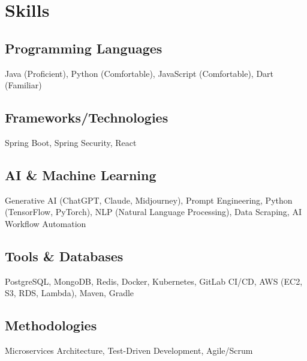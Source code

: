 \documentclass[]{deedy-resume-reversed}
\begin{document}
\begin{minipage}[t]{0.32\textwidth}



\section{Skills}
\subsection{Programming Languages}
Java (Proficient), Python (Comfortable), JavaScript (Comfortable), Dart (Familiar) \smallskip
\sectionsep

\subsection{Frameworks/Technologies}
Spring Boot, Spring Security, React \smallskip
\sectionsep

\subsection{AI \& Machine Learning}
Generative AI (ChatGPT, Claude, Midjourney), Prompt Engineering, Python (TensorFlow, PyTorch), NLP (Natural Language Processing), Data Scraping, AI Workflow Automation \smallskip
\sectionsep


\subsection{Tools \& Databases}
PostgreSQL, MongoDB, Redis, Docker, Kubernetes, GitLab CI/CD, AWS (EC2, S3, RDS, Lambda), Maven, Gradle \smallskip
\sectionsep

\subsection{Methodologies}
Microservices Architecture, Test-Driven Development, Agile/Scrum \smallskip
\sectionsep




\end{minipage}
\end{document}
